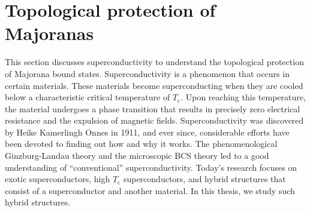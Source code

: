 \section{Topological protection of Majoranas}\label{sec:superconductivity}
This section discusses superconductivity to understand the topological protection of Majorana bound states.
Superconductivity is a phenomenon that occurs in certain materials.
These materials become superconducting when they are cooled below a characteristic critical temperature of $T_{\mathrm{c}}$.
Upon reaching this temperature, the material undergoes a phase transition that results in precisely zero electrical resistance and the expulsion of magnetic fields.
Superconductivity was discovered by Heike Kamerlingh Onnes in 1911, and ever since, considerable efforts have been devoted to finding out how and why it works.
The phenomenological Ginzburg-Landau theory and the microscopic BCS theory led to a good understanding of ``conventional'' superconductivity.
Today's research focuses on exotic superconductors, high $T_{\mathrm{c}}$ superconductors, and hybrid structures that consist of a superconductor and another material.
In this thesis, we study such hybrid structures.

